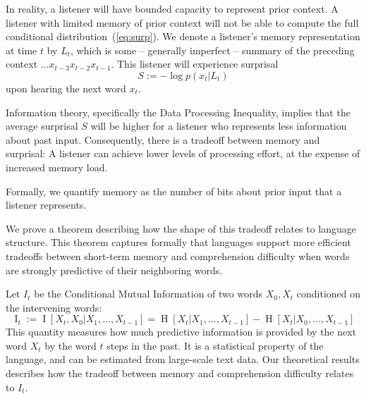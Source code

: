 \documentclass[11pt,letterpaper]{article}
\newcounter{theorem}
\begin{document}
In reality, a listener will have bounded capacity to represent prior context.
A listener with limited memory of prior context will not be able to compute the full conditional distribution~(\ref{eq:surp}).
We denote a listener's memory representation at time $t$ by $L_t$, which is some -- generally imperfect -- summary of the preceding context $\dots x_{t-3}x_{t-2}x_{t-1}$.
This listener will experience surprisal
\begin{equation}\label{eq:surp-listener}
	S :=	-\log p(x_t|L_t)
\end{equation}
upon hearing the next word $x_t$.

Information theory, specifically the Data Processing Inequality, implies that the average surprisal $S$ will be higher for a listener who represents less information about past input.
Consequently, there is a tradeoff between memory and surprisal:
A listener can achieve lower levels of processing effort, at the expense of increased memory load.

Formally, we quantify memory as the number of bits about prior input that a listener represents.


We prove a theorem describing how the shape of this tradeoff relates to language structure. %
This theorem captures formally that languages support more efficient tradeoffs between short-term memory and comprehension difficulty when words are strongly predictive of their neighboring words.



Let $I_t$ be the Conditional Mutual Information of two words $X_0, X_t$ conditioned on the intervening words:
\begin{equation}
	\operatorname{I}_t := \operatorname{I}[X_t, X_0 | X_1, \dots, X_{t-1}] = \operatorname{H}[X_t|X_1, \dots, X_{t-1}] - \operatorname{H}[X_t|X_0, \dots, X_{t-1}] 
\end{equation}
This quantity measures how much predictive information is provided by the next word $X_t$ by the word $t$ steps in the past.
It is a statistical property of the language, and can be estimated from large-scale text data.
Our theoretical results describes how the tradeoff between memory and comprehension difficulty relates to $I_t$.
\end{document}
